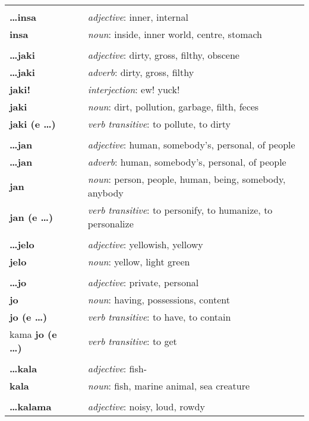 \begin{supertabular}{p{2,5cm}|ll}
 && \\ %
\textbf{\dots insa} && \textit{adjective}: inner, internal \\ 
\textbf{insa} && \textit{noun}: inside, inner world, centre, stomach \\ 
 && \\ %
\textbf{\dots jaki} && \textit{adjective}: dirty, gross, filthy, obscene \\ 
\textbf{\dots jaki} && \textit{adverb}: dirty, gross, filthy \\ 
\textbf{jaki!} && \textit{interjection}: ew! yuck! \\ 
\textbf{jaki} && \textit{noun}: dirt, pollution, garbage, filth, feces \\ 
\textbf{jaki (e \dots)} && \textit{verb transitive}: to pollute, to dirty \\ 
 && \\ %
\textbf{\dots jan} && \textit{adjective}: human, somebody's, personal, of people \\ 
\textbf{\dots jan} && \textit{adverb}: human, somebody's, personal, of people \\ 
\textbf{jan} && \textit{noun}: person, people, human, being, somebody, anybody \\ 
\textbf{jan (e \dots)} && \textit{verb transitive}: to personify, to humanize, to personalize \\ 
 && \\ %
\textbf{\dots jelo} && \textit{adjective}: yellowish, yellowy \\ 
\textbf{jelo} && \textit{noun}: yellow, light green \\ 
 && \\ %
\textbf{\dots jo} && \textit{adjective}: private, personal \\ 
\textbf{jo} && \textit{noun}: having, possessions, content \\ 
\textbf{jo (e \dots)} && \textit{verb transitive}: to have, to contain \\ 
kama \textbf{jo (e \dots)} && \textit{verb transitive}: to get \\ 
 && \\ %
\textbf{\dots kala} && \textit{adjective}: fish- \\ 
\textbf{kala} && \textit{noun}: fish, marine animal, sea creature \\ 
 && \\ %
\textbf{\dots kalama} && \textit{adjective}: noisy, loud, rowdy \\ 

\end{supertabular}

